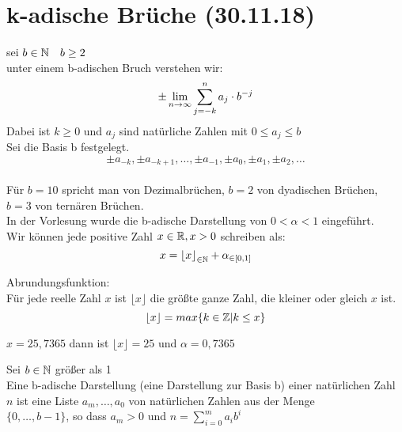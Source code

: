 \documentclass[../ana1u.tex]{subfiles}
\begin{document}
\setcounter{section}{5}

\section{k-adische Brüche (30.11.18)}
\begin{bsp}
    sei \(b \in \mathbb{N} \quad b \geq 2 \) \\
    unter einem b-adischen Bruch verstehen wir:
    \[\pm \lim\limits_{n\rightarrow\infty} \sum_{j=-k}^{n} a_j \cdot b^{-j} \]
    Dabei ist \(k \geq 0 \) und \(a_j \) sind natürliche Zahlen mit \(0 \leq a_j \leq b \) \\
    Sei die Basis b festgelegt.
    \[\pm a_{-k}, \pm a_{-k+1}, \dots ,\pm a_{-1}, \pm a_0, \pm a_1, \pm a_2, \dots \] \\
    Für \(b = 10 \) spricht man von Dezimalbrüchen, \(b = 2 \) von dyadischen Brüchen, 
    \(b = 3 \) von ternären Brüchen. \\
    In der Vorlesung wurde die b-adische Darstellung von \(0 < \alpha < 1\) eingeführt. \\
    Wir können jede positive Zahl \(x \in \mathbb{R}, x > 0\) schreiben als:
    \[x = {\lfloor x \rfloor}_{\in \mathbb{N}} + \alpha_{\in [0, 1]} \]
\end{bsp}
\begin{defi}
    Abrundungsfunktion: \\
    Für jede reelle Zahl \(x\) ist \(\lfloor x \rfloor\) die größte ganze Zahl, 
    die kleiner oder gleich \(x\) ist.
    \[\lfloor x \rfloor = max\{k \in \mathbb{Z} | k \leq x\} \]
    \begin{bsp}
        \(x = 25,7365 \) dann ist \(\lfloor x \rfloor = 25 \) und \(\alpha = 0,7365 \)
    \end{bsp}
\end{defi}
\begin{defi}
    Sei \(b \in \mathbb{N} \) größer als 1 \\
    Eine b-adische Darstellung (eine Darstellung zur Basis b) einer natürlichen Zahl \(n \) 
    ist eine Liste \(a_m, \dots, a_0 \) von natürlichen Zahlen aus der Menge \\
    \(\{0, \dots, b-1\} \), so dass \(a_m > 0 \) und \(n = \sum_{i=0}^{m} a_ib^i \)
\end{defi}
\end{document}
